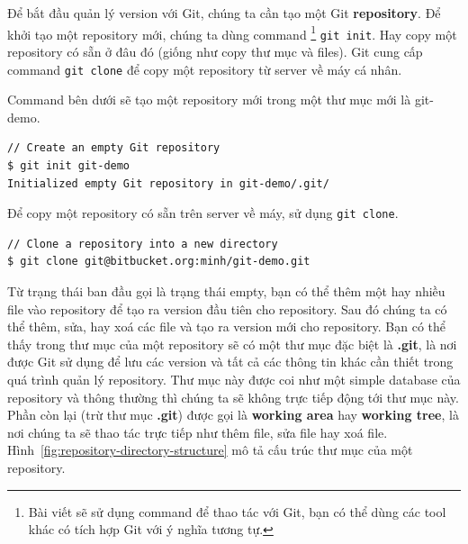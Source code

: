 \documentclass[a4paper, 11pt]{article}
\begin{document}
Để bắt đầu quản lý version với Git, chúng ta cần tạo một Git \textbf{repository}. Để khởi tạo một repository mới, chúng ta dùng command \footnote{Bài viết sẽ sử dụng command để thao tác với Git, bạn có thể dùng các tool khác có tích hợp Git với ý nghĩa tương tự.} \texttt{git init}. Hay copy một repository có sẵn ở đâu đó (giống như copy thư mục và files). Git cung cấp command \texttt{git clone} để copy một repository từ server về máy cá nhân.

Command bên dưới sẽ tạo một repository mới trong một thư mục mới là git-demo.

\begin{lstlisting}[language=bash]
// Create an empty Git repository
$ git init git-demo
Initialized empty Git repository in git-demo/.git/
\end{lstlisting}

\noindent Để copy một repository có sẵn trên server về máy, sử dụng \texttt{git clone}.

\begin{lstlisting}[language=bash]
// Clone a repository into a new directory
$ git clone git@bitbucket.org:minh/git-demo.git
\end{lstlisting}

Từ trạng thái ban đầu gọi là trạng thái empty, bạn có thể thêm một hay nhiều file vào repository để tạo ra version đầu tiên cho repository. Sau đó chúng ta có thể thêm, sửa, hay xoá các file và tạo ra version mới cho repository. Bạn có thể thấy trong thư mục của một repository sẽ có một thư mục đặc biệt là \textbf{.git}, là nơi được Git sử dụng để lưu các version và tất cả các thông tin khác cần thiết trong quá trình quản lý repository. Thư mục này được coi như một simple database của repository và thông thường thì chúng ta sẽ không trực tiếp động tới thư mục này. Phần còn lại (trừ thư mục \textbf{.git}) được gọi là \textbf{working area} hay \textbf{working tree}, là nơi chúng ta sẽ thao tác trực tiếp như thêm file, sửa file hay xoá file. Hình~\ref{fig:repository-directory-structure} mô tả cấu trúc thư mục của một repository.
\end{document}
